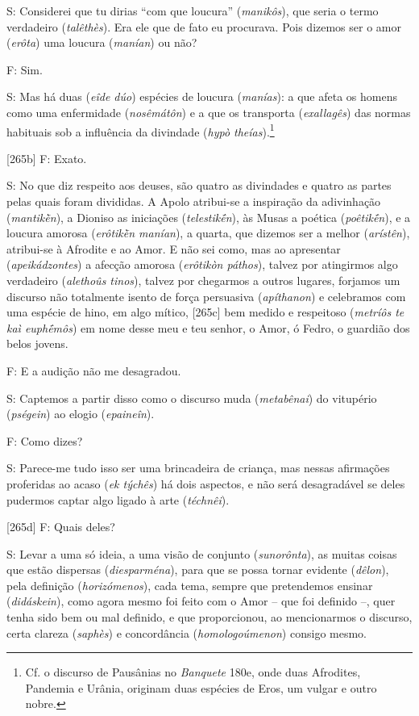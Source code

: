 S: Considerei que tu dirias ``com que loucura'' (\emph{manikôs}), que
seria o termo verdadeiro (\emph{talêthès}). Era ele que de fato eu
procurava. Pois dizemos ser o amor (\emph{erôta}) uma loucura
(\emph{manían}) ou não?

F: Sim.

S: Mas há duas (\emph{eîde dúo}) espécies de loucura (\emph{manías}): a
que afeta os homens como uma enfermidade (\emph{nosêmátôn}) e a que os
transporta (\emph{exallagês}) das normas habituais sob a influência da
divindade (\emph{hypò theías}).\footnote{Cf. o discurso de Pausânias no
  \emph{Banquete} 180e, onde duas Afrodites, Pandemia e Urânia, originam
  duas espécies de Eros, um vulgar e outro nobre.}

{[}265b{]} F: Exato.

S: No que diz respeito aos deuses, são quatro as divindades e quatro as
partes pelas quais foram divididas. A Apolo atribui-se a inspiração da
adivinhação (\emph{mantikḕn}), a Dioniso as iniciações
(\emph{telestikḗn}), às Musas a poética (\emph{poêtikḗn}), e a loucura
amorosa (\emph{erôtikḕn manían}), a quarta, que dizemos ser a melhor
(\emph{arístên}), atribui-se à Afrodite e ao Amor. E não sei como, mas
ao apresentar (\emph{apeikádzontes}) a afecção amorosa (\emph{erôtikòn
páthos}), talvez por atingirmos algo verdadeiro (\emph{alethoûs tinos}),
talvez por chegarmos a outros lugares, forjamos um discurso não
totalmente isento de força persuasiva (\emph{apíthanon}) e celebramos
com uma espécie de hino, em algo mítico, {[}265c{]} bem medido e
respeitoso (\emph{metríôs te kaì euphḗmôs}) em nome desse meu e teu
senhor, o Amor, ó Fedro, o guardião dos belos jovens.

F: E a audição não me desagradou.

S: Captemos a partir disso como o discurso muda (\emph{metabênai}) do
vitupério (\emph{pségein}) ao elogio (\emph{epaineîn}).

F: Como dizes?

S: Parece-me tudo isso ser uma brincadeira de criança, mas nessas
afirmações proferidas ao acaso (\emph{ek týchês}) há dois aspectos, e
não será desagradável se deles pudermos captar algo ligado à arte
(\emph{téchnêi}).

{[}265d{]} F: Quais deles?

S: Levar a uma só ideia, a uma visão de conjunto (\emph{sunorônta}), as
muitas coisas que estão dispersas (\emph{diesparména}), para que se
possa tornar evidente (\emph{dêlon}), pela definição
(\emph{horizómenos}), cada tema, sempre que pretendemos ensinar
(\emph{didáskein}), como agora mesmo foi feito com o Amor -- que foi
definido --, quer tenha sido bem ou mal definido, e que proporcionou, ao
mencionarmos o discurso, certa clareza (\emph{saphès}) e concordância
(\emph{homologoúmenon}) consigo mesmo.

